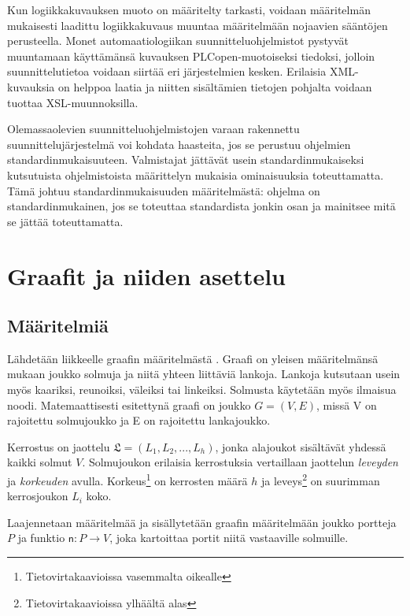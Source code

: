 \documentclass[finnish,12pt]{article}
\begin{document}
Kun logiikkakuvauksen muoto on määritelty tarkasti, voidaan määritelmän mukaisesti laadittu logiikkakuvaus muuntaa määritelmään nojaavien sääntöjen perusteella.
Monet automaatiologiikan suunnitteluohjelmistot pystyvät muuntamaan käyttämänsä kuvauksen PLCopen-muotoiseksi tiedoksi, jolloin suunnittelutietoa voidaan siirtää eri järjestelmien kesken.
Erilaisia XML-kuvauksia on helppoa laatia ja niitten sisältämien tietojen pohjalta voidaan tuottaa XSL-muunnoksilla. \cite{RefWorks:61}

Olemassaolevien suunnitteluohjelmistojen varaan rakennettu suunnittelujärjestelmä voi kohdata haasteita, jos se perustuu ohjelmien standardinmukaisuuteen.
Valmistajat jättävät usein standardinmukaiseksi kutsutuista ohjelmistoista määrittelyn mukaisia ominaisuuksia toteuttamatta.
Tämä johtuu standardinmukaisuuden määritelmästä: ohjelma on standardinmukainen, jos se toteuttaa standardista jonkin osan ja mainitsee mitä se jättää toteuttamatta. \cite{RefWorks:42}

	\clearpage
		
	\section{Graafit ja niiden asettelu}

	\subsection{Määritelmiä}

Lähdetään liikkeelle graafin määritelmästä \cite{RefWorks:39}.
Graafi on yleisen määritelmänsä mukaan joukko solmuja ja niitä yhteen liittäviä lankoja.
Lankoja kutsutaan usein myös kaariksi, reunoiksi, väleiksi tai linkeiksi. Solmusta käytetään myös ilmaisua noodi.
Matemaattisesti esitettynä graafi on joukko $G = (V, E)$, missä V on rajoitettu solmujoukko ja E on rajoitettu lankajoukko.

Kerrostus on jaottelu $\mathfrak{L} = (L_1, L_2, ..., L_h)$, jonka alajoukot sisältävät yhdessä kaikki solmut $V$.
Solmujoukon erilaisia kerrostuksia vertaillaan jaottelun \emph{leveyden} ja \emph{korkeuden} avulla.
Korkeus\footnote{Tietovirtakaavioissa vasemmalta oikealle} on kerrosten määrä $h$ ja leveys\footnote{Tietovirtakaavioissa ylhäältä alas} on suurimman kerrosjoukon $L_i$ koko.

Laajennetaan määritelmää ja sisällytetään graafin määritelmään joukko portteja $P$ ja funktio $\mathsf{n} : P \rightarrow V$, joka kartoittaa portit niitä vastaaville solmuille.
\end{document}
